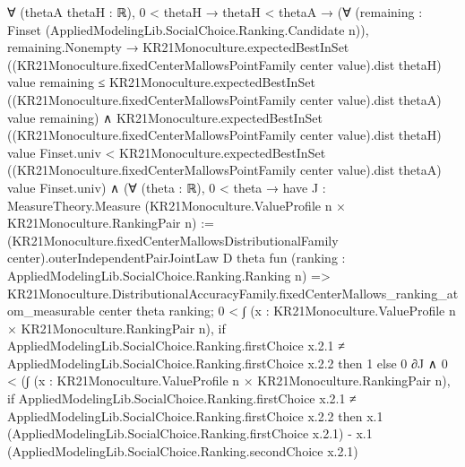 \documentclass[10pt]{article}
\begin{document}
\begin{ReviewVerbatim}
                    ∀ (thetaA thetaH : ℝ),
                      0 < thetaH →
                        thetaH < thetaA →
                          (∀ (remaining : Finset (AppliedModelingLib.SocialChoice.Ranking.Candidate n)),
                              remaining.Nonempty →
                                KR21Monoculture.expectedBestInSet
                                    ((KR21Monoculture.fixedCenterMallowsPointFamily center value).dist thetaH) value
                                    remaining ≤
                                  KR21Monoculture.expectedBestInSet
                                    ((KR21Monoculture.fixedCenterMallowsPointFamily center value).dist thetaA) value
                                    remaining) ∧
                            KR21Monoculture.expectedBestInSet
                                ((KR21Monoculture.fixedCenterMallowsPointFamily center value).dist thetaH) value
                                Finset.univ <
                              KR21Monoculture.expectedBestInSet
                                ((KR21Monoculture.fixedCenterMallowsPointFamily center value).dist thetaA) value
                                Finset.univ) ∧
            (∀ (theta : ℝ),
                0 < theta →
                  have J : MeasureTheory.Measure (KR21Monoculture.ValueProfile n × KR21Monoculture.RankingPair n) :=
                    (KR21Monoculture.fixedCenterMallowsDistributionalFamily center).outerIndependentPairJointLaw D theta
                      fun (ranking : AppliedModelingLib.SocialChoice.Ranking.Ranking n) =>
                      KR21Monoculture.DistributionalAccuracyFamily.fixedCenterMallows_ranking_atom_measurable center
                        theta ranking;
                  0 <
                      ∫ (x : KR21Monoculture.ValueProfile n × KR21Monoculture.RankingPair n),
                        if
                            AppliedModelingLib.SocialChoice.Ranking.firstChoice x.2.1 ≠
                              AppliedModelingLib.SocialChoice.Ranking.firstChoice x.2.2 then
                          1
                        else 0 ∂J ∧
                    0 <
                      (∫ (x : KR21Monoculture.ValueProfile n × KR21Monoculture.RankingPair n),
                          if
                              AppliedModelingLib.SocialChoice.Ranking.firstChoice x.2.1 ≠
                                AppliedModelingLib.SocialChoice.Ranking.firstChoice x.2.2 then
                            x.1 (AppliedModelingLib.SocialChoice.Ranking.firstChoice x.2.1) -
                              x.1 (AppliedModelingLib.SocialChoice.Ranking.secondChoice x.2.1)

\end{ReviewVerbatim}
\end{document}
